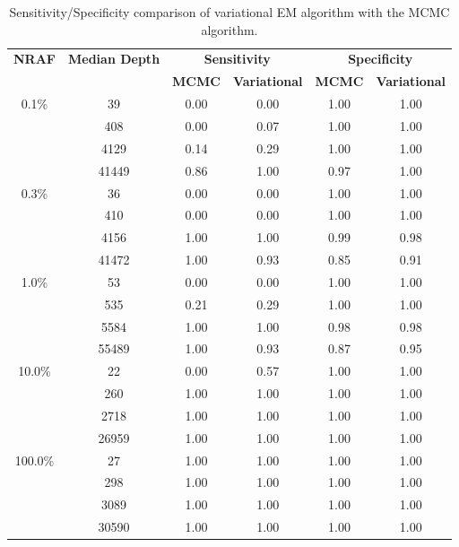 \documentclass{bmcart}
\begin{document}
\begin{table}[h!]
\caption{Sensitivity/Specificity comparison of variational EM algorithm with the MCMC algorithm.}\label{table:mcmcvar}
\small
\begin{tabular}{c c c c c c }
\hline
\toprule
	{\bfseries NRAF} & {\bfseries Median Depth} & \multicolumn{2}{c}{{{\bfseries Sensitivity}}} &  \multicolumn{2}{c}{\bfseries Specificity} \\
	\cmidrule(r{4pt}){3-4} \cmidrule(l){5-6}
	 ~ & ~ & {\bfseries MCMC} & {\bfseries Variational} & {\bfseries MCMC} & {\bfseries Variational}   \\
	\midrule
	0.1\% & 39 & 0.00 & 0.00 & 1.00 & 1.00   \\
	 & 408 & 0.00 & 0.07 & 1.00 & 1.00   \\
	 & 4129 & 0.14 & 0.29 & 1.00 & 1.00   \\
	 & 41449 & 0.86 & 1.00 & 0.97 & 1.00   \\
	0.3\% & 36 & 0.00 & 0.00 & 1.00 & 1.00   \\
	 & 410 & 0.00 & 0.00 & 1.00 & 1.00   \\
	 & 4156 & 1.00 & 1.00 & 0.99 & 0.98   \\
	 & 41472 & 1.00 & 0.93 & 0.85 & 0.91   \\
	1.0\% & 53 & 0.00 & 0.00 & 1.00 & 1.00   \\
	 & 535 & 0.21 & 0.29 & 1.00 & 1.00  \\
	 & 5584 & 1.00 & 1.00 & 0.98 & 0.98   \\
	 & 55489 & 1.00 & 0.93 & 0.87 & 0.95   \\
	10.0\% & 22 & 0.00 & 0.57 & 1.00 & 1.00   \\
	 & 260 & 1.00 & 1.00 & 1.00 & 1.00   \\
	 & 2718 & 1.00 & 1.00 & 1.00 & 1.00   \\
	 & 26959 & 1.00 & 1.00 & 1.00 & 1.00   \\
	100.0\% & 27 & 1.00 & 1.00 & 1.00 & 1.00   \\
	 & 298 & 1.00 & 1.00 & 1.00 & 1.00   \\
	 & 3089 & 1.00 & 1.00 & 1.00 & 1.00   \\
	 & 30590 & 1.00 & 1.00 & 1.00 & 1.00   \\
	\bottomrule
\end{tabular}
\end{table}
\end{document}
